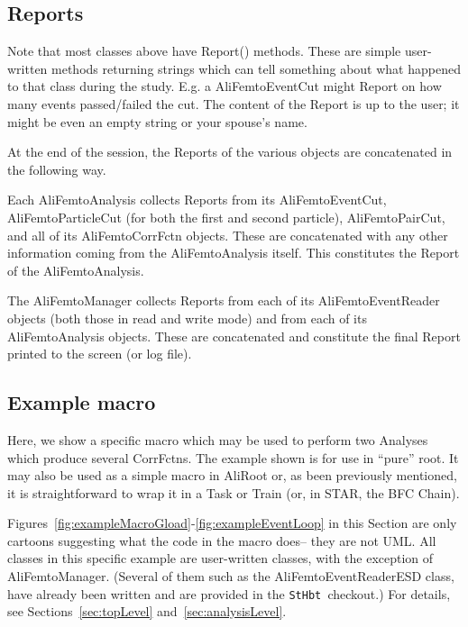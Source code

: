 \documentclass[twoside]{article}
\newcommand{\name}[1]{\textsf{#1}}%
\newcommand{\meth}[1]{\textsf{#1}}%
\newcommand{\cvs}{{\tt StHbt }}
\begin{document}
\subsection{Reports}
\label{sec:reports}

Note that most classes above have \meth{Report()} methods.  These are simple user-written methods returning strings which can tell something about
what happened to that class during the study.  E.g. a \name{AliFemtoEventCut} might Report on how many events passed/failed the
cut.  The content of the Report is up to the user; it might be even an empty string or your spouse's name.


At the end of the session, the Reports of the various objects are concatenated in the following way.

Each AliFemtoAnalysis
collects Reports from its AliFemtoEventCut, AliFemtoParticleCut (for both the first and second particle), AliFemtoPairCut, and all
of its AliFemtoCorrFctn objects.  These are concatenated with any other information coming from the AliFemtoAnalysis itself.
This constitutes the Report of the AliFemtoAnalysis.

The AliFemtoManager collects Reports from each of its AliFemtoEventReader objects (both those in read and write mode)
and from each of its AliFemtoAnalysis objects.  These are concatenated and constitute the final Report
printed to the screen (or log file).  



\subsection{Example macro}
\label{sec:example}

Here, we show a specific macro which may be used to perform two Analyses which produce several CorrFctns.  The example
shown is for use in ``pure'' root.  It may also be used as a simple macro in AliRoot or, as been previously mentioned,
it is straightforward to wrap it in a Task or Train (or, in STAR, the BFC Chain).

Figures~\ref{fig:exampleMacroGload}-\ref{fig:exampleEventLoop} in this Section are only cartoons suggesting what the
code in the macro does-- they are not UML.  All classes in this specific example are user-written
classes, with the exception of AliFemtoManager.  (Several of them such as the \name{AliFemtoEventReaderESD} class,
have already been written and are provided in the \cvs checkout.)
 For details, see Sections~\ref{sec:topLevel} and~\ref{sec:analysisLevel}.
\end{document}
